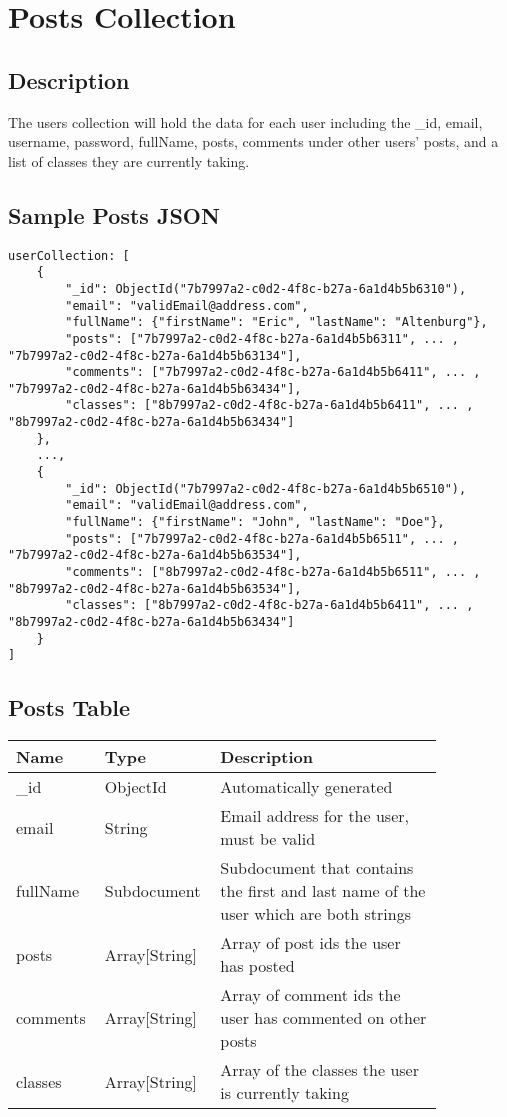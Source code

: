 \documentclass[preprint,11pt,3p]{article}
\begin{document}
\newpage

\section{Posts Collection}

\subsection{Description}
	The users collection will hold the data for each user including the _id, email, username, password, fullName, posts, comments under other users' posts, and a list of classes they are currently taking.

\subsection{Sample Posts JSON}
\begin{lstlisting}
userCollection: [
	{
		"_id": ObjectId("7b7997a2-c0d2-4f8c-b27a-6a1d4b5b6310"),
		"email": "validEmail@address.com",
		"fullName": {"firstName": "Eric", "lastName": "Altenburg"},
		"posts": ["7b7997a2-c0d2-4f8c-b27a-6a1d4b5b6311", ... , "7b7997a2-c0d2-4f8c-b27a-6a1d4b5b63134"],
		"comments": ["7b7997a2-c0d2-4f8c-b27a-6a1d4b5b6411", ... , "7b7997a2-c0d2-4f8c-b27a-6a1d4b5b63434"],
		"classes": ["8b7997a2-c0d2-4f8c-b27a-6a1d4b5b6411", ... , "8b7997a2-c0d2-4f8c-b27a-6a1d4b5b63434"]
	},
	...,
	{
		"_id": ObjectId("7b7997a2-c0d2-4f8c-b27a-6a1d4b5b6510"),
		"email": "validEmail@address.com",
		"fullName": {"firstName": "John", "lastName": "Doe"},
		"posts": ["7b7997a2-c0d2-4f8c-b27a-6a1d4b5b6511", ... , "7b7997a2-c0d2-4f8c-b27a-6a1d4b5b63534"],
		"comments": ["8b7997a2-c0d2-4f8c-b27a-6a1d4b5b6511", ... , "8b7997a2-c0d2-4f8c-b27a-6a1d4b5b63534"],
		"classes": ["8b7997a2-c0d2-4f8c-b27a-6a1d4b5b6411", ... , "8b7997a2-c0d2-4f8c-b27a-6a1d4b5b63434"]
	}
]
\end{lstlisting}

\subsection{Posts Table}
\begingroup
\setlength{\tabcolsep}{15pt} %
\renewcommand{\arraystretch}{1.5} %
\begin{tabular}{| p{0.15\linewidth} | p{0.20\linewidth} | p{0.5\linewidth} |}
	\hline
	\textbf{Name} & \textbf{Type} & \textbf{Description} \\
	\hline
	_id & ObjectId & Automatically generated\\
	\hline
	email & String & Email address for the user, must be valid\\
	\hline
	fullName & Subdocument & Subdocument that contains the first and last name of the user which are both strings\\
	\hline
	posts & Array[String] & Array of post ids the user has posted\\
	\hline
	comments & Array[String] & Array of comment ids the user has commented on other posts\\
	\hline
	classes & Array[String] & Array of the classes the user is currently taking\\
	\hline
\end{tabular}
\endgroup
\end{document}
